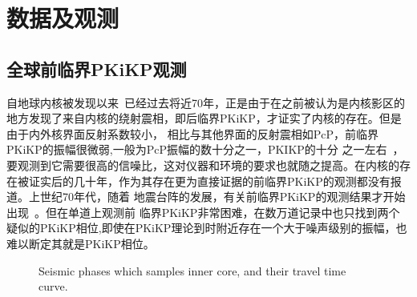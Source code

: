 \chapter{数据及观测}


\section{全球前临界PKiKP观测}

自地球内核被发现以来~\citep{lehmann1936p}已经过去将近70年，正是由于在之前被认为是内核影区的
地方发现了来自内核的绕射震相，即后临界PKiKP，才证实了内核的存在。但是由于内外核界面反射系数较小，
相比与其他界面的反射震相如PcP，前临界PKiKP的振幅很微弱,一般为PcP振幅的数十分之一，PKIKP的十分
之一左右~\citep{Bolt1965}，要观测到它需要很高的信噪比，这对仪器和环境的要求也就随之提高。在内核的存在被证实后的几十年，作为其存在更为直接证据的前临界PKiKP的观测都没有报道。上世纪70年代，随着
地震台阵的发展，有关前临界PKiKP的观测结果才开始出现~\citep{Engdahl1970a}。但在单道上观测前
临界PKiKP非常困难，\citep{Shearer1990}在数万道记录中也只找到两个疑似的PKiKP相位,即使在PKiKP理论到时附近存在一个大于噪声级别的振幅，也难以断定其就是PKiKP相位。

\begin{figure}[!ht]
	\hfill{}
	\hfill{}
	\hfill{}
	\caption{Seismic phases which samples inner core, and their travel time %
curve.}
\end{figure}

